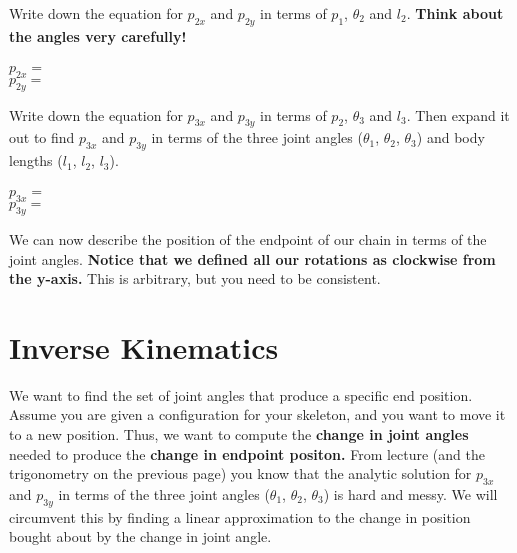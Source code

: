 \documentclass[]{article}
\begin{document}
Write down the equation for $p_{2x}$ and $p_{2y}$ in terms of $p_1$, $\theta_2$ and $l_2$. \textbf{Think about the angles very carefully!}
\\
\\
    $p_{2x} = $ %
\vspace{0.5cm}
\\
    $p_{2y} = $ %
\vspace{0.5cm}

Write down the equation for $p_{3x}$ and $p_{3y}$ in terms of $p_2$, $\theta_3$ and $l_3$. Then expand it out to find $p_{3x}$ and $p_{3y}$ in terms of the three joint angles ($\theta_1$, $\theta_2$, $\theta_3$) and body lengths ($l_1$, $l_2$, $l_3$). 
\\
\\
    $p_{3x} = $ %
\vspace{1.5cm}
\\
    $p_{3y} = $ %
\vspace{1cm}

We can now describe the position of the endpoint of our chain in terms of the joint angles. \textbf{Notice that we defined all our rotations as clockwise from the y-axis.} This is arbitrary, but you need to be consistent.
 
\section{Inverse Kinematics}
We want to find the set of joint angles that produce a specific end position. Assume you are given a configuration for your skeleton, and you want to move it to a new position. Thus, we want to compute the \textbf{change in joint angles} needed to produce the \textbf{change in endpoint positon.} From lecture (and the trigonometry on the previous page) you know that the analytic solution for $p_{3x}$ and $p_{3y}$ in terms of the three joint angles ($\theta_1$, $\theta_2$, $\theta_3$) is hard and messy. We will circumvent this by finding a linear approximation to the change in position bought about by the change in joint angle.
\end{document}
